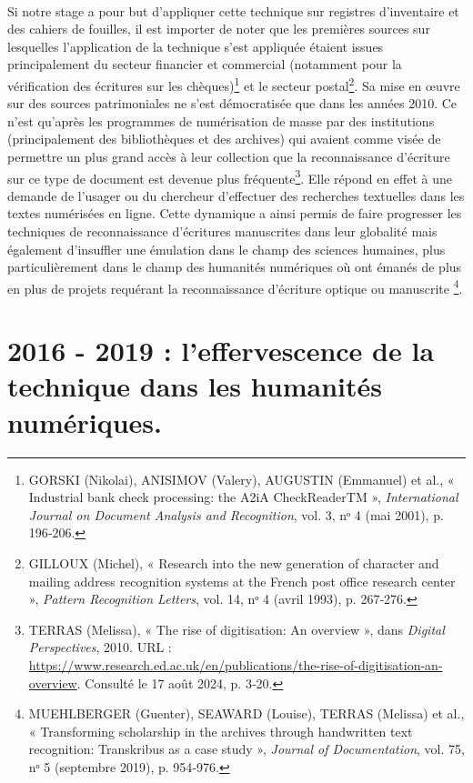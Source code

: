 \documentclass[a4paper,12pt,twoside]{book}
\begin{document}
\paragraph{}
Si notre stage a pour but d’appliquer cette technique sur registres d’inventaire et des cahiers de fouilles, il est importer de noter que les premières sources sur lesquelles l’application de la technique s’est appliquée étaient issues principalement du secteur financier et commercial (notamment pour la vérification des écritures sur les chèques)\footnote{\textsc{GORSKI} (Nikolai), \textsc{ANISIMOV} (Valery), \textsc{AUGUSTIN} (Emmanuel) et al., « Industrial bank check processing: the A2iA CheckReaderTM », \emph{International Journal on Document Analysis and Recognition}, vol. 3, nᵒ 4 (mai 2001), p. 196‑206.} et le secteur postal\footnote{ \textsc{GILLOUX} (Michel), « Research into the new generation of character and mailing address recognition systems at the French post office research center », \emph{Pattern Recognition Letters}, vol. 14, nᵒ 4 (avril 1993), p. 267‑276.}. Sa mise en œuvre sur des sources patrimoniales ne s’est démocratisée que dans les années 2010. Ce n’est qu’après les programmes de numérisation de masse par des institutions (principalement des bibliothèques et des archives) qui avaient comme visée de permettre un plus grand accès à leur collection que la reconnaissance d’écriture sur ce type de document est devenue plus fréquente\footnote{TERRAS (Melissa), « The rise of digitisation: An overview », dans \emph{Digital Perspectives}, 2010. URL : \url{https://www.research.ed.ac.uk/en/publications/the-rise-of-digitisation-an-overview}. Consulté le 17 août 2024, p. 3‑20.}. Elle répond en effet à une demande de l’usager ou du chercheur d’effectuer des recherches textuelles dans les textes numérisées en ligne. Cette dynamique a ainsi permis de faire progresser les techniques de reconnaissance d’écritures manuscrites dans leur globalité mais également d'insuffler une émulation dans le champ des sciences humaines, plus particulièrement dans le champ des humanités numériques où ont émanés de plus en plus de projets requérant la reconnaissance d’écriture optique ou manuscrite \footnote{  \textsc{MUEHLBERGER} (Guenter), \textsc{SEAWARD} (Louise), \textsc{TERRAS} (Melissa) et al., « Transforming scholarship in the archives through handwritten text recognition: Transkribus as a case study », \emph{Journal of Documentation}, vol. 75, nᵒ 5 (septembre 2019), p. 954‑976.}.   

\section{2016 - 2019 : l'effervescence de la technique dans les humanités numériques.}
\end{document}

